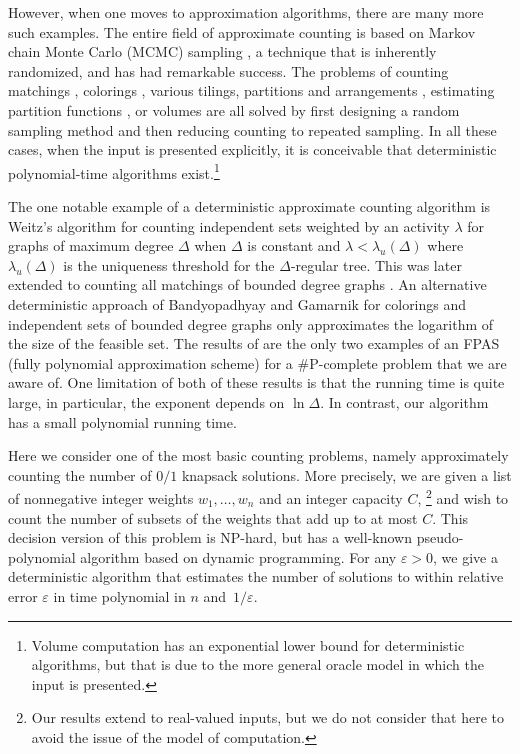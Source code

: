 \documentclass[11pt]{article}
\def\eps{\varepsilon}
\begin{document}
However, when one moves to approximation algorithms, there are
many more such examples. The entire field of approximate counting
is based on Markov chain Monte Carlo (MCMC) sampling
\cite{JerrumSinclair:survey}, a technique that is inherently
randomized, and has had remarkable success. The problems of
counting matchings
\cite{JerrumSinclair:matchings,JerrumSinclairVigoda}, colorings
\cite{Jerrum:colorings}, various tilings, partitions and
arrangements \cite{LubyRandallSinclair}, estimating partition
functions \cite{JerrumSinclair:Ising,StefankovicVempalaVigoda}, or
volumes \cite{DyerFriezeKannan,LovaszVempala} are all solved by
first designing a random sampling method and then reducing
counting to repeated sampling.
In all these cases, when
the input is presented explicitly, it is conceivable that
deterministic polynomial-time algorithms exist.\footnote{Volume
computation has an exponential lower bound for deterministic
algorithms, but that is due to the more general oracle model in
which the input is presented.}

The one notable example of a deterministic approximate counting
algorithm is Weitz's algorithm \cite{Weitz} for counting independent
sets weighted by an activity $\lambda$ for graphs of maximum degree $\Delta$
when $\Delta$ is constant and
$\lambda<\lambda_u(\Delta)$ where $\lambda_u(\Delta)$ is
the uniqueness threshold for the $\Delta$-regular tree.
This was later extended to counting all matchings of bounded degree
graphs \cite{BGKNT}.
An alternative deterministic approach of Bandyopadhyay and
Gamarnik \cite{BG} for colorings and independent sets of bounded degree
graphs only approximates the logarithm of the size of the feasible set.
The results of \cite{Weitz,BGKNT}
are the only two examples of an FPAS (fully polynomial approximation
scheme) for a \#P-complete problem that we are aware of.
One limitation of both of these results is that the running time is quite
large, in particular, the exponent depends on $\ln{\Delta}$.
In contrast, our algorithm has a small polynomial running time.


Here we consider one of the most basic counting problems, namely
approximately counting the number of $0/1$ knapsack solutions.
More precisely, we are given a list of nonnegative integer weights
$w_1, \ldots, w_n$ and an integer capacity $C$,
\footnote{Our results extend to real-valued inputs, but we do not
consider that here to avoid the issue of the model of computation.}
and wish to count the number of subsets of
the weights that add up to at most $C$. This decision version of
this problem is NP-hard, but has a well-known pseudo-polynomial
algorithm based on dynamic programming. For any $\eps > 0$, we
give a deterministic algorithm that estimates the number of
solutions to within relative error $\eps$ in time polynomial in
$n$ and~$1/\eps$.
\end{document}
